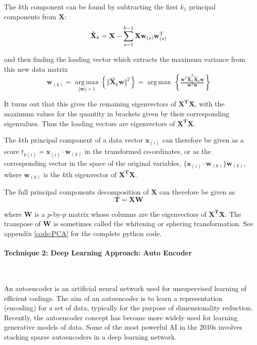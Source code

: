 \documentclass{mcmthesis}
\begin{document}
The $k$th component can be found by subtracting the first $k_1$ principal components from $\textbf{X}$:
\begin{equation}
    \mathbf {\hat {X}} _{k}=\mathbf {X} -\sum _{s=1}^{k-1}\mathbf {X} \mathbf {w} _{(s)}\mathbf {w} _{(s)}^{\rm {T}}
\end{equation}

and then finding the loading vector which extracts the maximum variance from this new data matrix
\begin{equation}
    \mathbf {w} _{(k)}={\underset {\Vert \mathbf {w} \Vert =1}{\operatorname {arg\,max} }}\left\{\Vert \mathbf {\hat {X}} _{k}\mathbf {w} \Vert ^{2}\right\}={\operatorname {\arg \,max} }\,\left\{{\tfrac {\mathbf {w} ^{T}\mathbf {\hat {X}} _{k}^{T}\mathbf {\hat {X}} _{k}\mathbf {w} }{\mathbf {w} ^{T}\mathbf {w} }}\right\}
\end{equation}

It turns out that this gives the remaining eigenvectors of $\mathbf{X^TX}$, with the maximum values for the quantity in brackets given by their corresponding eigenvalues. Thus the loading vectors are eigenvectors of $\mathbf{X^TX}$.

The $k$th principal component of a data vector $\mathbf{x}_{(i)}$ can therefore be given as a score $t_{k(i)} = \mathbf{x}_{(i)} \cdot \mathbf{w}_{(k)}$ in the transformed co-ordinates, or as the corresponding vector in the space of the original variables, $\{\mathbf{x}_{(i)} \cdot \mathbf{w}_{(k)}\} \mathbf{w}_{(k)}$, where $\mathbf{w}_{(k)}$ is the $k$th eigenvector of $\mathbf{X^TX}$.

The full principal components decomposition of $\mathbf{X}$ can therefore be given as
\begin{equation}
    \mathbf {T} =\mathbf {X} \mathbf {W}
\end{equation}

where $\mathbf{W}$ is a $p$-by-$p$ matrix whose columns are the eigenvectors of $\mathbf{X^TX}$. The transpose of $\mathbf{W}$ is sometimes called the whitening or sphering transformation. See appendix \ref{code:PCA} for the complete python code. 

\paragraph{\textbf{Technique 2: Deep Learning Approach: Auto Encoder}}

~\smallskip

An autoencoder is an artificial neural network used for unsupervised learning of efficient codings. The aim of an autoencoder is to learn a representation (encoding) for a set of data, typically for the purpose of dimensionality reduction. Recently, the autoencoder concept has become more widely used for learning generative models of data. Some of the most powerful AI in the 2010s involves stacking sparse autoencoders in a deep learning network.
\end{document}
